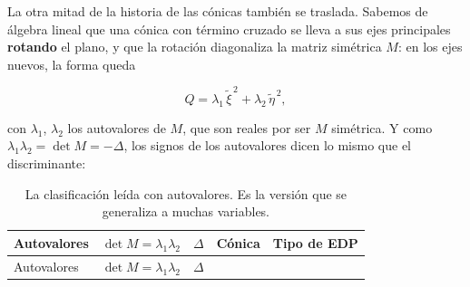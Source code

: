 \documentclass[
  spanish,
  a4paper,
]{scrbook}
\theoremstyle{definition}
\theoremstyle{plain}
\theoremstyle{definition}
\theoremstyle{plain}
\theoremstyle{definition}
\theoremstyle{remark}
\begin{document}
La otra mitad de la historia de las cónicas también se traslada. Sabemos
de álgebra lineal que una cónica con término cruzado se lleva a sus ejes
principales \textbf{rotando} el plano, y que la rotación diagonaliza la
matriz simétrica \(M\): en los ejes nuevos, la forma queda

\[
Q = \lambda_1\,\tilde\xi^{\,2} + \lambda_2\,\tilde\eta^{\,2} ,
\]

con \(\lambda_1\), \(\lambda_2\) los autovalores de \(M\), que son
reales por ser \(M\) simétrica. Y como
\(\lambda_1\lambda_2 = \det M = -\Delta\), los signos de los autovalores
dicen lo mismo que el discriminante:

\begin{longtable}[]{@{}
  >{\raggedright\arraybackslash}p{}
  >{\centering\arraybackslash}p{}
  >{\centering\arraybackslash}p{}
  >{\raggedright\arraybackslash}p{}
  >{\raggedright\arraybackslash}p{}@{}}
\caption{La clasificación leída con autovalores. Es la versión que se
generaliza a muchas variables.}\label{tbl-autovalores}\tabularnewline
\toprule\noalign{}
\begin{minipage}[b]{\linewidth}\raggedright
Autovalores
\end{minipage} & \begin{minipage}[b]{\linewidth}\centering
\(\det M = \lambda_1\lambda_2\)
\end{minipage} & \begin{minipage}[b]{\linewidth}\centering
\(\Delta\)
\end{minipage} & \begin{minipage}[b]{\linewidth}\raggedright
Cónica
\end{minipage} & \begin{minipage}[b]{\linewidth}\raggedright
Tipo de EDP
\end{minipage} \\
\midrule\noalign{}
\endfirsthead
\toprule\noalign{}
\begin{minipage}[b]{\linewidth}\raggedright
Autovalores
\end{minipage} & \begin{minipage}[b]{\linewidth}\centering
\(\det M = \lambda_1\lambda_2\)
\end{minipage} & \begin{minipage}[b]{\linewidth}\centering
\(\Delta\)
\end{minipage} & \begin{minipage}[b]{\linewidth}\raggedright

\end{minipage}
\end{longtable}
\end{document}
